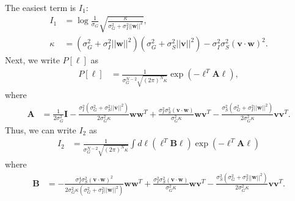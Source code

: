 \documentclass[11pt]{article}
\begin{document}
The easiest term is $I_1$:
\begin{align}
	I_1 &= \log \frac{1}{\sigma_G} \sqrt{\frac{\kappa}{\sigma_G^2 + \sigma_I^2 ||\mathbf{w}||^2}},\\
	\kappa &= (\sigma_G^2 + \sigma_I^2 ||\mathbf{w}||^2)(\sigma_G^2 + \sigma_S^2 ||\mathbf{v}||^2) - \sigma_I^2 \sigma_S^2 (\mathbf{v}\cdot\mathbf{w})^2.
\end{align}
Next, we write $P[\boldsymbol{\ell}]$ as 
\begin{align}
	P[\boldsymbol{\ell}] &= \frac{1}{\sigma_G^{N-2}\sqrt{(2\pi)^N \kappa}} \exp\left(- \boldsymbol{\ell}^T \mathbf{A} \boldsymbol{\ell}\right), 
\end{align}
where 
\begin{align}
	\mathbf{A} &= \frac{1}{2\sigma_G^2}\mathbf{I} - \frac{\sigma_I^2(\sigma_G^2 +\sigma_S^2 ||\mathbf{v}||^2)}{2\sigma_G^2 \kappa} \mathbf{ww}^T+ \frac{\sigma_I^2 \sigma_S^2 (\mathbf{v}\cdot \mathbf{w})}{\sigma_G^2 \kappa} \mathbf{wv}^T - \frac{\sigma_S^2 (\sigma_G^2 + \sigma_I^2 ||\mathbf{w}||^2)}{2\sigma_G^2 \kappa} \mathbf{vv}^T.
\end{align}
Thus, we can write $I_2$ as 
\begin{align}
	I_2 &= \frac{1}{\sigma_G^{N-2}\sqrt{(2\pi)^N \kappa}}\int d\boldsymbol{\ell} (\boldsymbol{\ell}^T \mathbf{B} \boldsymbol{\ell}) \exp(-\boldsymbol{\ell}^T \mathbf{A} \boldsymbol{\ell})
\end{align}
where 
\begin{align}
	\mathbf{B} &= - \frac{\sigma_I^4 \sigma_S^2 (\mathbf{v}\cdot \mathbf{w})^2}{2 \sigma_G^2 \kappa(\sigma_G^2 + \sigma_I^2 ||\mathbf{w}||^2)} \mathbf{ww}^T+ \frac{\sigma_I^2 \sigma_S^2 (\mathbf{v}\cdot \mathbf{w})}{\sigma_G^2 \kappa} \mathbf{wv}^T - \frac{\sigma_S^2(\sigma_G^2 + \sigma_I^2 ||\mathbf{w}||^2)}{2 \sigma_G^2 \kappa} \mathbf{vv}^T.
\end{align}
\end{document}

